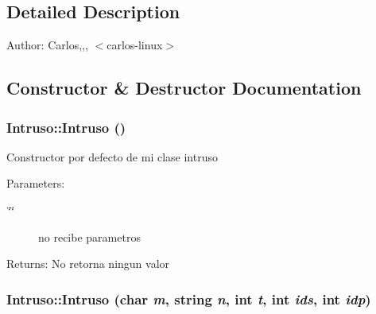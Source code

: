 \subsection{Detailed Description}
\begin{Desc}
\item[Author:]Carlos,,, $<$carlos-linux$>$ \end{Desc}


\subsection{Constructor \& Destructor Documentation}
\hypertarget{classIntruso_f36bc9ec8ef7b46e9335c6842908a527}{
\subsubsection[Intruso]{\setlength{\rightskip}{0pt plus 5cm}Intruso::Intruso ()}}
\label{classIntruso_f36bc9ec8ef7b46e9335c6842908a527}


Constructor por defecto de mi clase intruso \begin{Desc}
\item[Parameters:]
\begin{description}
\item[{\em \char`\"{}\char`\"{}}]no recibe parametros \end{description}
\end{Desc}
\begin{Desc}
\item[Returns:]No retorna ningun valor \end{Desc}
\hypertarget{classIntruso_c8f76c5d9e67549e75cb816820867e7f}{
\subsubsection[Intruso]{\setlength{\rightskip}{0pt plus 5cm}Intruso::Intruso (char {\em m}, \/  string {\em n}, \/  int {\em t}, \/  int {\em ids}, \/  int {\em idp})}}
\label{classIntruso_c8f76c5d9e67549e75cb816820867e7f}


